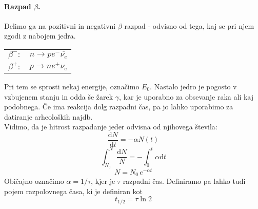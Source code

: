 \documentclass[a4paper]{article}
\newcommand{\dif}{\mathrm{d}}
\newcommand{\dd}[2]{\frac{\mathrm{d} {#1}}{\mathrm{d} {#2}}}
\begin{document}
\paragraph{Razpad \(\beta\).} Delimo ga na pozitivni in negativni \(\beta\) razpad - odvisno od tega, kaj se pri njem zgodi z nabojem jedra.
\begin{table}[h!]
    \centering
    \begin{tabular}{c c}
        \(\beta^-:\) & \(n \to p e^- \overline{\nu_e}\) \\
        \(\beta^+:\) & \(p\to n e^+ \nu_e\) \\
    \end{tabular}
\end{table}
Pri tem se sprosti nekaj energije, označimo \(E_0\). Nastalo jedro je pogosto v vzbujenem stanju in odda še žarek \(\gamma\), kar je uporabno za obsevanje raka ali kaj podobnega.
Če ima reakcija dolg razpadni čas, pa jo lahko uporabimo za datiranje arheoloških najdb. \\
Vidimo, da je hitrost razpadanje jeder odvisna od njihovega števila:
$$\dd{N}{t} = - \alpha N(t)$$
$$\int_{N_0}^{N}\frac{\dif N}{N} = -\int_{0}^{t}\alpha \dif t$$
$$N = N_0\,e^{-\alpha t}$$
Običajno označimo $\alpha = 1/\tau$, kjer je $\tau$ razpadni čas. Definiramo pa lahko tudi pojem razpolovnega časa, ki je definiran kot
$$t_{1/2} = \tau \ln 2$$
\end{document}
